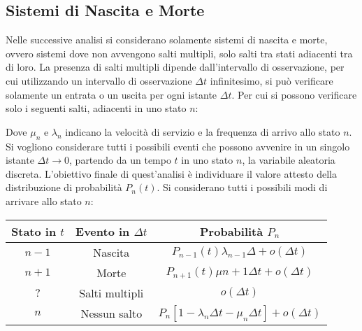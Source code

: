 \documentclass{article}
\numberwithin{equation}{subsection}
\begin{document}
\subsection{Sistemi di Nascita e Morte}

Nelle successive analisi si considerano solamente sistemi di nascita e morte, ovvero sistemi dove non avvengono salti multipli, solo salti tra stati adiacenti tra di loro. 
La presenza di salti multipli dipende dall'intervallo di osservazione, per cui utilizzando un intervallo di osservazione $\Delta t$ infinitesimo, si può verificare solamente 
un entrata o un uscita per ogni istante $\Delta t$. Per cui si possono verificare solo i seguenti salti, adiacenti in uno stato $n$:
\begin{center}
\end{center}
Dove $\mu_n$ e $\lambda_n$ indicano la velocità di servizio e la frequenza di arrivo allo stato $n$. Si vogliono considerare tutti i possibili eventi che possono 
avvenire in un singolo istante $\Delta t\to0$, partendo da un tempo $t$ in uno stato $n$, la variabile aleatoria discreta. L'obiettivo finale di quest'analisi è individuare 
il valore attesto della distribuzione di probabilità $P_n(t)$. Si considerano tutti i possibili modi di arrivare allo stato $n$:

\begin{center}
    \begin{tabular}{|c|c|c|}
        \hline
        Stato in $t$ & Evento in $\Delta t$ & Probabilità $P_n$ \\
        \hline
        $n-1$ & Nascita & $P_{n-1}(t)\lambda_{n-1}\Delta +o(\Delta t)$\\
        \hline
        $n+1$ & Morte & $P_{n+1}(t)\mu{n+1}\Delta t+o(\Delta t)$\\
        \hline
        $?$ & Salti multipli & $o(\Delta t)$\\
        \hline
        $n$ & Nessun salto & $P_n\left[1-\lambda_n\Delta t-\mu_n\Delta t\right]+o(\Delta t)$\\
        \hline
    \end{tabular} 
\end{center}
\end{document}
